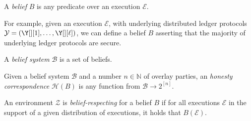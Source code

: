 \begin{definition}[Belief]
  A \emph{belief} $B$ is any predicate over an execution $\mathcal{E}$.
\end{definition}

For example, given an execution $\mathcal{E}$, with underlying distributed ledger
protocols $\mathcal{Y} = (\Y[][1], \ldots, \Y[][\ell])$, we can define a belief
$B$ asserting that the majority of underlying ledger protocols are secure.

\begin{definition}
  A \emph{belief system} $\mathcal{B}$ is a set of beliefs.
\end{definition}

\begin{definition}
  Given a belief system $\mathcal{B}$ and a number $n \in \mathbb{N}$ of overlay parties,
  an \emph{honesty correspondence} $\mathcal{H}(B)$ is any function
  from $\mathcal{B} \longrightarrow 2^{[n]}$.
\end{definition}

\begin{definition}
  An environment $\mathcal{Z}$ is \emph{belief-respecting} for a belief $B$
  if for all executions $\mathcal{E}$ in the support of
  a given distribution of executions, it holds that $B(\mathcal{E})$.
\end{definition}

